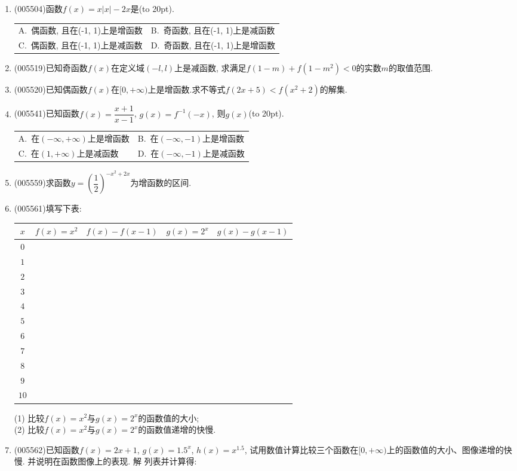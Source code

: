 \documentclass[10pt,a4paper]{article}
\newcommand{\bracket}[1]{(\hbox to #1pt{})}
\newcommand{\twoch}[4]{\par\begin{tabular}{p{.46\textwidth}p{.46\textwidth}}
A.~#1& B.~#2\\
C.~#3& D.~#4
\end{tabular}}
\newcommand{\fourch}[4]{\par\begin{tabular}{p{.23\textwidth}p{.23\textwidth}p{.23\textwidth}p{.23\textwidth}}
A.~#1 &B.~#2& C.~#3& D.~#4
\end{tabular}}
\begin{document}
\begin{enumerate}[1.]
\fourch{在(-2, 0)上是增函数}{在(0, 2)上是增函数}{在(-1, 0)上是减函数}{在(0, 1)上是减函数}
\item {\tiny (005504)}函数$f(x)=x|x|-2x$是\bracket{20}.
\twoch{偶函数, 且在(-1, 1)上是增函数}{奇函数, 且在(-1, 1)上是减函数}{偶函数, 且在(-1, 1)上是减函数}{奇函数, 且在(-1, 1)上是增函数}
\item {\tiny (005519)}已知奇函数$f(x)$在定义域$(-l, l)$上是减函数, 求满足$f(1-m)+f(1-m^2)<0$的实数$m$的取值范围.
\item {\tiny (005520)}已知偶函数$f(x)$在$[0,+\infty)$上是增函数.求不等式$f(2x+5)<f(x^2+2)$的解集.
\item {\tiny (005541)}已知函数$f(x)=\dfrac{x+1}{x-1}$, $g(x)=f^{-1}(-x)$, 则$g(x)$\bracket{20}.
\twoch{在$(-\infty ,+\infty)$上是增函数}{在$(-\infty ,-1)$上是增函数}{在$(1,+\infty)$上是减函数}{在$(-\infty ,-1)$上是减函数}
\item {\tiny (005559)}求函数$y=(\dfrac 12)^{-x^2+2x}$为增函数的区间.
\item {\tiny (005561)}填写下表:
\begin{center}
    \begin{tabular}{|c|c|c|c|c|}
        \hline
        $x$	 & $f(x)=x^2$ & $f(x)-f(x-1)$ & $g(x)=2^x$ & $g(x)-g(x-1)$ \\ \hline
        $0$ & & & & \\ \hline
        $1$ & & & & \\ \hline
        $2$ & & & & \\ \hline
        $3$ & & & & \\ \hline
        $4$ & & & & \\ \hline
        $5$ & & & & \\ \hline
        $6$ & & & & \\ \hline
        $7$ & & & & \\ \hline
        $8$ & & & & \\ \hline
        $9$ & & & & \\ \hline
        $10$ & & & & \\ \hline
    \end{tabular}
\end{center}
(1) 比较$f(x)=x^2$与$g(x)=2^x$的函数值的大小;\\
(2) 比较$f(x)=x^2$与$g(x)=2^x$的函数值递增的快慢.
\item {\tiny (005562)}已知函数$f(x)=2x+1$, $g(x)=1.5^x$, $h(x)=x^{1.5}$, 试用数值计算比较三个函数在$[0,+\infty)$上的函数值的大小、图像递增的快慢. 并说明在函数图像上的表现.
解  列表并计算得:
\begin{center}

\end{center}
\end{enumerate}
\end{document}
